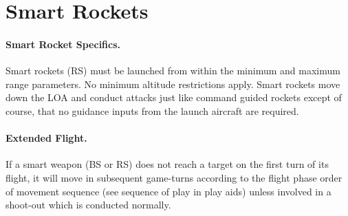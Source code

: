 
\section{Smart Rockets}

\paragraph{Smart Rocket Specifics.} Smart rockets (RS) must be launched from within the minimum and maximum range parameters. No minimum altitude restrictions apply. Smart rockets move down the LOA and conduct attacks just like command guided rockets except of course, that no guidance inputs from the launch aircraft are required.



\paragraph{Extended Flight.} If a smart weapon (BS or RS) does not reach a target on the first turn of its flight, it will move in subsequent game-turns according to the flight phase order of movement sequence (see sequence of play in play aids) unless involved in a shoot-out which is conducted normally.



